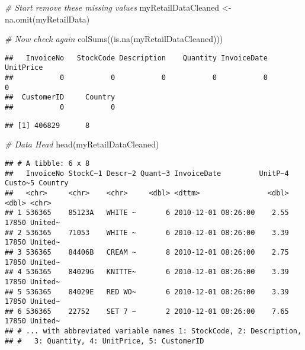 \documentclass[
]{article}
\newenvironment{Shaded}{\begin{snugshade}}{\end{snugshade}}
\newcommand{\AttributeTok}[1]{\textcolor[rgb]{0.77,0.63,0.00}{#1}}
\newcommand{\CommentTok}[1]{\textcolor[rgb]{0.56,0.35,0.01}{\textit{#1}}}
\newcommand{\FunctionTok}[1]{\textcolor[rgb]{0.00,0.00,0.00}{#1}}
\newcommand{\NormalTok}[1]{#1}
\newcommand{\OtherTok}[1]{\textcolor[rgb]{0.56,0.35,0.01}{#1}}
\newcommand{\SpecialCharTok}[1]{\textcolor[rgb]{0.00,0.00,0.00}{#1}}
\newcommand{\StringTok}[1]{\textcolor[rgb]{0.31,0.60,0.02}{#1}}
\begin{document}
\begin{Shaded}
\begin{Highlighting}[]
\CommentTok{\# Start remove these missing values}
\NormalTok{myRetailDataCleaned }\OtherTok{\textless{}{-}} \FunctionTok{na.omit}\NormalTok{(myRetailData)}

\CommentTok{\# Now check again }
\FunctionTok{colSums}\NormalTok{((}\FunctionTok{is.na}\NormalTok{(myRetailDataCleaned)))}
\end{Highlighting}
\end{Shaded}

\begin{verbatim}
##   InvoiceNo   StockCode Description    Quantity InvoiceDate   UnitPrice 
##           0           0           0           0           0           0 
##  CustomerID     Country 
##           0           0
\end{verbatim}

\begin{Shaded}
\end{Shaded}

\begin{verbatim}
## [1] 406829      8
\end{verbatim}

\begin{Shaded}
\begin{Highlighting}[]
\CommentTok{\# Data Head}
\FunctionTok{head}\NormalTok{(myRetailDataCleaned)}
\end{Highlighting}
\end{Shaded}

\begin{verbatim}
## # A tibble: 6 x 8
##   InvoiceNo StockC~1 Descr~2 Quant~3 InvoiceDate         UnitP~4 Custo~5 Country
##   <chr>     <chr>    <chr>     <dbl> <dttm>                <dbl>   <dbl> <chr>  
## 1 536365    85123A   WHITE ~       6 2010-12-01 08:26:00    2.55   17850 United~
## 2 536365    71053    WHITE ~       6 2010-12-01 08:26:00    3.39   17850 United~
## 3 536365    84406B   CREAM ~       8 2010-12-01 08:26:00    2.75   17850 United~
## 4 536365    84029G   KNITTE~       6 2010-12-01 08:26:00    3.39   17850 United~
## 5 536365    84029E   RED WO~       6 2010-12-01 08:26:00    3.39   17850 United~
## 6 536365    22752    SET 7 ~       2 2010-12-01 08:26:00    7.65   17850 United~
## # ... with abbreviated variable names 1: StockCode, 2: Description,
## #   3: Quantity, 4: UnitPrice, 5: CustomerID
\end{verbatim}
\end{document}
